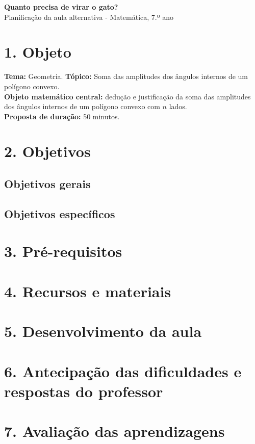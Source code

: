 \begin{center}
{\large\bfseries\color{azulPDMI}Quanto precisa de virar o gato?}\\[3pt]
{\small Planificação da aula alternativa - Matemática, 7.º ano}
\end{center}

\section*{1. Objeto}
\textbf{Tema:} Geometria. \textbf{Tópico:} Soma das amplitudes dos ângulos internos de um polígono convexo.\\
\textbf{Objeto matemático central:} dedução e justificação da soma das amplitudes dos ângulos internos de um polígono convexo com $n$ lados.\\
\textbf{Proposta de duração:} 50 minutos.

\section*{2. Objetivos}

\subsection*{Objetivos gerais}

\subsection*{Objetivos específicos}

\section*{3. Pré-requisitos}

\section*{4. Recursos e materiais}

\section*{5. Desenvolvimento da aula}

\section*{6. Antecipação das dificuldades e respostas do professor}

\section*{7. Avaliação das aprendizagens}


